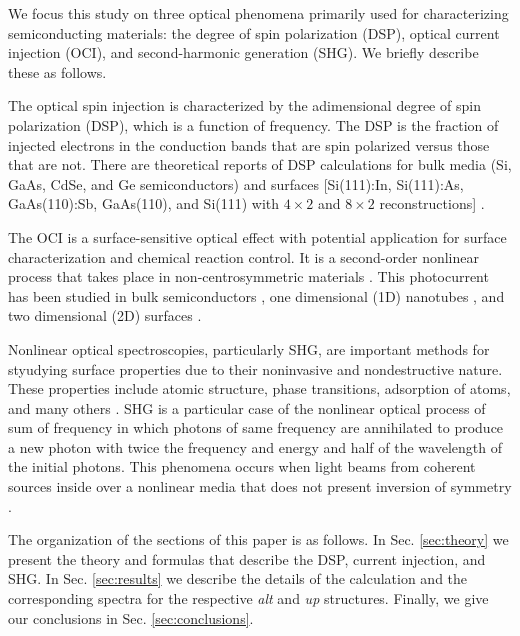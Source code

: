 \documentclass[pss]{wiley2sp} %
\begin{document}
We focus this study on three optical phenomena primarily used for
characterizing semiconducting materials: the degree of spin polarization
(DSP), optical current injection (OCI), and second-harmonic generation (SHG).
We briefly describe these as follows.

The optical spin injection is characterized by the adimensional degree of spin polarization (DSP), which is a function of frequency. The DSP is the fraction of injected electrons in the conduction bands that are spin polarized versus those that are not. There are theoretical reports of DSP calculations for bulk media (Si, GaAs, CdSe, and Ge semiconductors) \cite{nastos2007full,cabellos2009stress,rioux2010optical} and surfaces [Si(111):In, Si(111):As, GaAs(110):Sb, GaAs(110), and Si(111) with $4\times2$ and $8\times2$ reconstructions] \cite{mendoza2012optical,arzate2014optical}.

The OCI is a surface-sensitive optical effect with potential application for surface characterization and chemical reaction control. It is a second-order nonlinear process that takes place in non-centrosymmetric materials \cite{nastos2006optical,cabellos2011optical,bhat2005excitonic,fraser1999quantum}. This photocurrent has been studied in bulk semiconductors \cite{atanasov1996coherent,sipe2000second}, one dimensional (1D) nanotubes \cite{mele2000coherent,kral2000photogalvanic}, and two dimensional (2D) surfaces \cite{mele2000coherent,cabellos2011optical}.

Nonlinear optical spectroscopies, particularly SHG, are important methods for styudying surface properties due to their noninvasive and nondestructive nature. These properties include atomic structure, phase transitions, adsorption of atoms, and many others \cite{dadap1997second,daum1993identification,mcgilp1994probing,power1995resonant,godefroy1996electric,salazar2014molecular,chen1981surface,mendoza1998microscopic}. SHG is a particular case of the nonlinear optical process of sum of frequency in which photons of same frequency are annihilated to produce a new photon with twice the frequency and energy and half of the wavelength of the initial photons. This phenomena occurs when light beams from coherent sources inside over a nonlinear media that does not present inversion of symmetry \cite{bloembergen1962light,andersonPRB15,sipe2000second}.

The organization of the sections of this paper is as follows. In Sec. \ref{sec:theory} we present the theory and formulas that describe the DSP, current injection, and SHG. In Sec. \ref{sec:results} we describe the details of the calculation and the corresponding spectra for the respective \emph{alt} and \emph{up} structures. Finally, we give our conclusions in Sec. \ref{sec:conclusions}.
\end{document}
